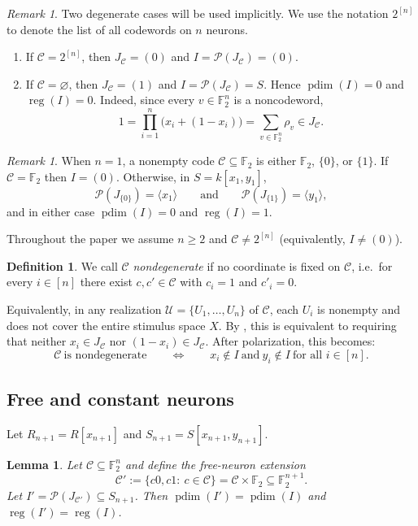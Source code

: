 \documentclass[12pt]{amsart}
\newtheorem{lemma}[theorem]{Lemma}
\theoremstyle{remark}
\newtheorem{remark}[theorem]{Remark}
\theoremstyle{definition}
\newtheorem{definition}[theorem]{Definition}
\DeclareMathOperator{\reg}{reg}
\DeclareMathOperator{\pd}{pdim}
\newcommand{\F}{\mathbb{F}}
\newcommand{\C}{\mathcal{C}}
\newcommand{\U}{\mathcal{U}}
\def\P{{\mathcal P}}
\begin{document}
\begin{remark}\label{rem:degenerate-codes}
Two degenerate cases will be used implicitly. 
We use the notation $2^{[n]}$ to denote the list of all codewords on $n$ neurons. 
\begin{enumerate}[label=(\alph*)]
\item If $\C= 2^{[n]}$, then $J_\C=(0)$ and $I=\P(J_\C)=(0)$.
\item If $\C=\varnothing$, then $J_\C=(1)$ and $I=\P(J_\C)=S$. Hence $\pd(I)=0$ and $\reg(I)=0$.
Indeed, since every $v\in\F_2^n$ is a noncodeword,
\[
1  =  \prod_{i=1}^n\bigl(x_i+(1-x_i)\bigr)  =  \sum_{v\in\F_2^n}\rho_v \in J_\C.
\]
\end{enumerate}
\end{remark}

\begin{remark}\label{rem:n=1}
When $n=1$, a nonempty code $\C\subseteq\F_2$ is either $\F_2$, $\{0\}$, or $\{1\}$.
If $\C=\F_2$ then $I=(0)$.  Otherwise, in $S=k[x_1,y_1]$,
\[
\P(J_{\{0\}})=\langle x_1\rangle
\qquad\text{and}\qquad
\P(J_{\{1\}})=\langle y_1\rangle,
\]
and in either case $\pd(I)=0$ and $\reg(I)=1$.
\end{remark}

\medskip

Throughout the paper we assume $n\ge 2$ and $\C\neq 2^{[n]}$ (equivalently, $I\neq (0)$).

\begin{definition}\label{def:nondegenerate}
We call $\C$ \emph{nondegenerate} if no coordinate is fixed on $\C$, i.e.\ for every $i\in[n]$ there
exist $c,c'\in\C$ with $c_i=1$ and $c'_i=0$.

Equivalently, in any realization $\U=\{U_1,\dots,U_n\}$ of $\C$, each $U_i$ is nonempty and does not
cover the entire stimulus space $X$.  By , this is equivalent to requiring
that neither $x_i\in J_\C$ nor $(1-x_i)\in J_\C$.  After polarization, this becomes:
\[
\C\ \text{is nondegenerate}\qquad\Longleftrightarrow\qquad
x_i\notin I\ \text{and}\ y_i\notin I\ \text{for all }i\in[n].
\]
\end{definition}

\subsection*{Free and constant neurons}

Let $R_{n+1}=R[x_{n+1}]$ and $S_{n+1}=S[x_{n+1},y_{n+1}]$.

\begin{lemma}\label{lem:free-neuron}
Let $\C\subseteq\F_2^n$ and define the free-neuron extension
\[
\C'  :=  \{c0, c1:\ c\in\C\} = \C\times\F_2  \subseteq \F_2^{n+1}.
\]
Let $I'=\P(J_{\C'})\subseteq S_{n+1}$.  Then $\pd(I')=\pd(I)$ and $\reg(I')=\reg(I)$.
\end{lemma}
\end{document}

